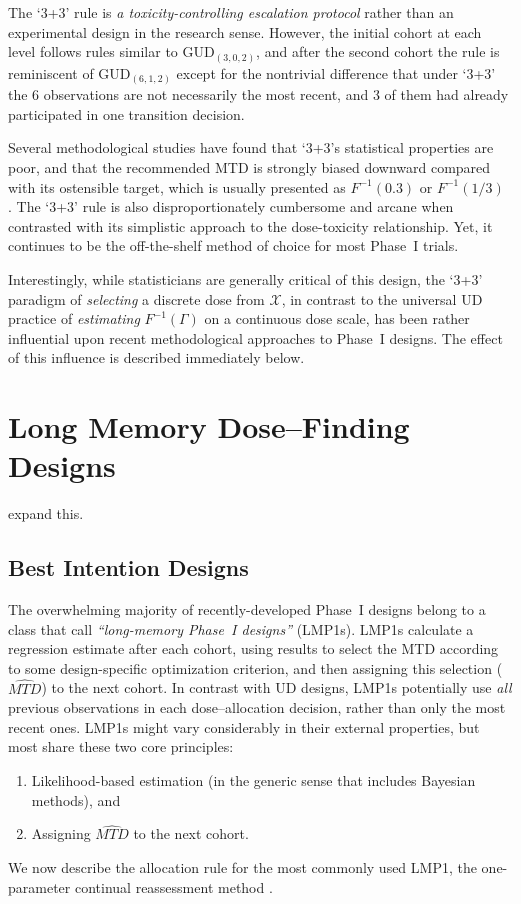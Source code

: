 The `3+3' rule is \emph{a toxicity-controlling escalation protocol} rather than an experimental design in the research sense. However, the initial cohort at each level follows rules similar to GUD$_{(3,0,2)}$, and after the second cohort the rule is reminiscent of GUD$_{(6,1,2)}$  except for the nontrivial difference that under `3+3' the 6 observations are not necessarily the most recent, and 3 of them had already participated in one transition decision.

Several methodological studies have found that `3+3's statistical properties are poor, and that the recommended MTD is strongly biased downward compared with its ostensible target, which is usually presented as $F^{-1}(0.3)$ or $F^{-1}(1/3)$ \citep{Rein:Paol:O'Qu:oper:1999,Lin:Shih:stat:2001}. The `3+3' rule is also disproportionately cumbersome and arcane when contrasted with its simplistic approach to the dose-toxicity relationship. Yet, it continues to be the off-the-shelf method of choice for most Phase~I trials.

Interestingly, while statisticians are generally critical of this design, the `3+3' paradigm of \emph{selecting} a discrete dose from $\mathcal{X}$, in contrast to the universal UD practice of \emph{estimating} $F^{-1}(\Gamma)$ on a continuous dose scale, has been rather influential upon recent methodological approaches to Phase~I designs. The effect of this influence is described immediately below.

\section{Long Memory Dose--Finding Designs}
expand this.
\subsection{Best Intention Designs}
The overwhelming majority of recently-developed Phase~I designs belong to a class that \cite{Oron:Hoff:smal:2013} call \emph{``long-memory Phase~I designs''} (LMP1s). LMP1s calculate a regression estimate after each cohort, using results to select the MTD according to some design-specific optimization criterion, and then assigning this selection ($\widehat{MTD}$) to the next cohort. In contrast with UD designs, LMP1s potentially use \emph{all} previous observations in each dose--allocation decision, rather than only the most recent ones. LMP1s might vary considerably in their external properties, but most share these two core principles:
\begin{enumerate}
\item Likelihood-based estimation (in the generic sense that includes Bayesian methods), and
\item Assigning  $\widehat{MTD}$ to the next cohort.
\end{enumerate}
We now describe the allocation rule for the most commonly used LMP1, the one-parameter continual reassessment method  \citep{O'Qu:Pepe:Fish:cont:1990}.

